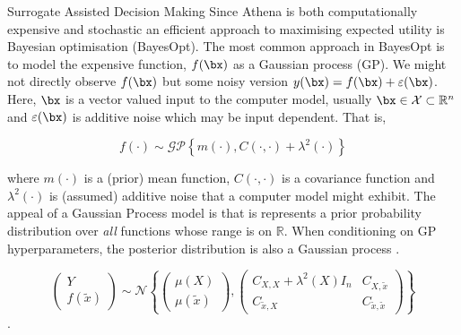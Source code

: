 \begin{chapter}{Surrogate Assisted Decision Making \label{Chap:optimisation}}
Since Athena is both computationally expensive and stochastic an efficient approach to maximising expected utility is Bayesian optimisation (BayesOpt). The most common approach in BayesOpt is to model the expensive function, $f(\bx)$ as a Gaussian process (GP). We might not directly observe $f(\bx)$ but some noisy version $y(\bx) = f(\bx) + \varepsilon(\bx)$. Here, $\bx$ is a vector valued input to the computer model, usually $\bx \in \mathcal{X} \subset \mathbb{R}^n$ and $\varepsilon(\bx)$ is additive noise which may be input dependent. That is,

\begin{equation}
  f(\cdot) \sim \mathcal{GP} \left\{ m(\cdot), C(\cdot, \cdot) + \lambda^2(\cdot) \right\}
\end{equation}

where $m(\cdot)$ is a (prior) mean function, $C(\cdot, \cdot)$ is a covariance function and $\lambda^2(\cdot)$ is (assumed) additive noise that a computer model might exhibit. The appeal of a Gaussian Process model is that is represents a prior probability distribution over \textit{all} functions whose range is on $\mathbb{R}$. When conditioning on GP hyperparameters, the posterior distribution is also a Gaussian process \cite{williams2006}. %

\begin{equation}
  \begin{pmatrix}
    Y \\ f(\tilde{x})
  \end{pmatrix} \sim \mathcal{N} \left \{
  \begin{pmatrix}
    \mu(X) \\ \mu(\tilde{x})
  \end{pmatrix} , \begin{pmatrix}
    C_{X, X} + \lambda^2(X)I_n & C_{X, \tilde{x}} \\
    C_{\tilde{x}, X} & C_{\tilde{x}, \tilde{x}}
\end{pmatrix} \right\}
\end{equation}.


\end{chapter}
